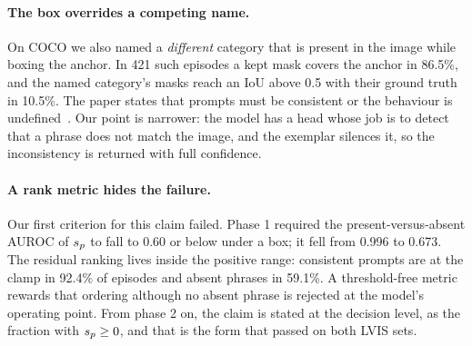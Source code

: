 \paragraph{The box overrides a competing name.}
On COCO we also named a \emph{different} category that is present in the image while boxing the anchor.
In 421 such episodes a kept mask covers the anchor in 86.5\%, and the named category's masks reach an IoU above 0.5 with their ground truth in 10.5\%.
The \sam{} paper states that prompts must be consistent or the behaviour is undefined~\cite{carion2026sam3}.
Our point is narrower: the model has a head whose job is to detect that a phrase does not match the image, and the exemplar silences it, so the inconsistency is returned with full confidence.

\paragraph{A rank metric hides the failure.}
Our first criterion for this claim failed.
Phase 1 required the present-versus-absent AUROC of $s_p$ to fall to 0.60 or below under a box; it fell from 0.996 to 0.673.
The residual ranking lives inside the positive range: consistent prompts are at the clamp in 92.4\% of episodes and absent phrases in 59.1\%.
A threshold-free metric rewards that ordering although no absent phrase is rejected at the model's operating point.
From phase 2 on, the claim is stated at the decision level, as the fraction with $s_p \geq 0$, and that is the form that passed on both LVIS sets.
